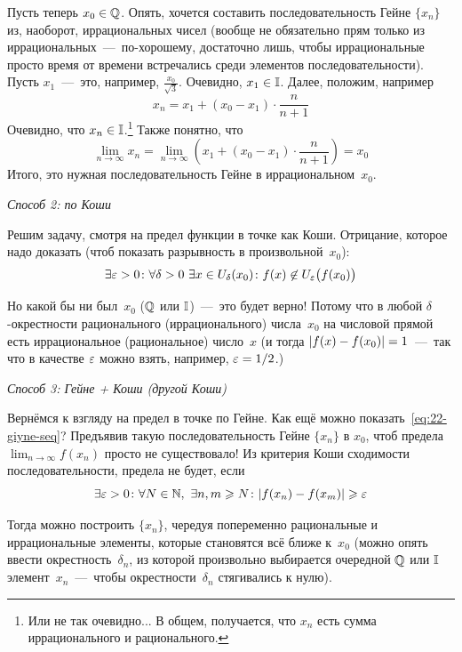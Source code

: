 \documentclass[a4paper,12pt]{article}
\begin{document}
\begin{solution}
    Пусть теперь $x_0 \hm\in \QQ$.
    Опять, хочется составить последовательность Гейне $\{x_n\}$ из, наоборот, иррациональных чисел (вообще не обязательно прям только из иррациональных~---~по-хорошему, достаточно лишь, чтобы иррациональные просто время от времени встречались среди элементов последовательности).
    Пусть $x_1$~---~это, например, $\frac{x_0}{\sqrt{3}}$.
    Очевидно, $x_1 \hm\in \II$.
    Далее, положим, например
    \[
      x_n = x_1 + (x_0 - x_1) \cdot \frac{n}{n + 1}
    \]
    Очевидно, что $x_n \hm\in \II$.\footnote{
      Или не так очевидно...
      В общем, получается, что $x_n$ есть сумма иррационального и рационального.
    }
    Также понятно, что
    \[
      \lim_{n \to \infty} x_n = \lim_{n \to \infty} \left(x_1 + (x_0 - x_1) \cdot \frac{n}{n + 1}\right) = x_0
    \]
    Итого, это нужная последовательность Гейне в иррациональном~$x_0$.

    \medskip
    
    \emph{Способ 2: по Коши}

    Решим задачу, смотря на предел функции в точке как Коши.
    Отрицание, которое надо доказать (чтоб показать разрывность в произвольной~$x_0$):
    \[
      \exists \varepsilon > 0\colon \forall \delta > 0\ \exists x \in U_{\delta}(x_0)\colon f(x) \not\in U_{\varepsilon}\bigl(f(x_0)\bigr)
    \]

    Но какой бы ни был~$x_0$ ($\mathbb Q$ или $\mathbb I$)~---~это будет верно!
    Потому что в любой $\delta$-окрестности рационального (иррационального) числа~$x_0$ на числовой прямой есть иррациональное (рациональное) число~$x$ (и тогда $|f(x) \hm- f(x_0)| \hm= 1$~---~так что в качестве $\varepsilon$ можно взять, например, $\eps \hm= 1 \hm/ 2$.)

    \medskip
    
    \emph{Способ 3: Гейне + Коши (другой Коши)}

    Вернёмся к взгляду на предел в точке по Гейне.
    Как ещё можно показать~\eqref{eq:22-giyne-seq}?
    Предъявив такую последовательность Гейне $\{x_n\}$ в $x_0$, чтоб предела $\lim_{n \to \infty} f(x_n)$ просто не существовало!
    Из критерия Коши сходимости последовательности, предела не будет, если
    \[
      \exists \varepsilon > 0\colon \forall N \in \mathbb N,\ \exists n, m \geqslant N\colon |f(x_n) - f(x_m)| \geqslant \varepsilon
    \]

    Тогда можно построить $\{x_n\}$, чередуя попеременно рациональные и иррациональные элементы, которые становятся всё ближе к~$x_0$ (можно опять ввести окрестность~$\delta_n$, из которой произвольно выбирается очередной $\mathbb Q$ или $\mathbb I$ элемент~$x_n$~---~чтобы окрестности~$\delta_n$ стягивались к нулю).
    

\end{solution}
\end{document}
